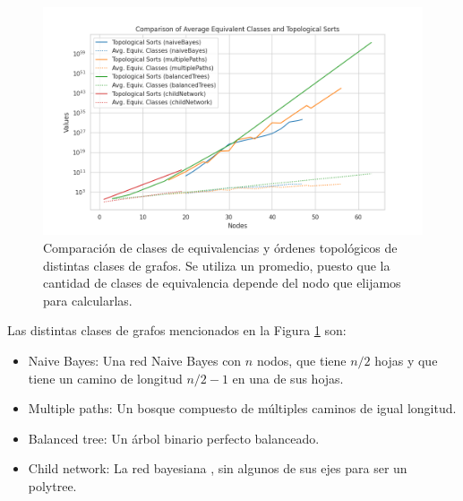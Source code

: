 \begin{figure}[ht]
    \centering
    \includegraphics[width=1\linewidth]{img/equivalentClassesVsToposorts.png}
     \caption[Caption for image]{Comparación de clases de equivalencias y órdenes topológicos de distintas clases de grafos. Se utiliza un promedio, puesto que la cantidad de clases de equivalencia depende del nodo que elijamos para calcularlas. \footnotemark }
    \label{fig:equivalenceClassesVsToposortsNumberPlot}
\end{figure}



Las distintas clases de grafos mencionados en la Figura \ref{fig:equivalenceClassesVsToposortsNumberPlot} son: 
\begin{itemize}
    \item Naive Bayes: Una red Naive Bayes con $n$ nodos, que tiene $n/2$ hojas y que tiene un camino de longitud $n/2-1$ en una de sus hojas. %
    \item Multiple paths: Un bosque compuesto de múltiples caminos de igual longitud. 
    \item Balanced tree: Un árbol binario perfecto balanceado.  
    \item Child network: La red bayesiana \childNetwork, sin algunos de sus ejes para ser un polytree. 
    
\end{itemize}

